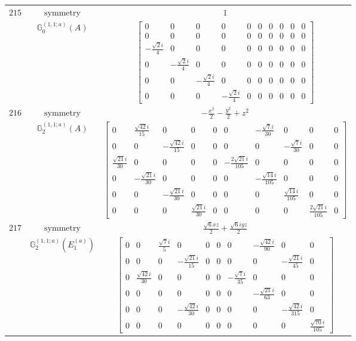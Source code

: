\documentclass[fleqn,8pt,landscape]{jsarticle}
\begin{document}
\begin{longtable}{ccc}
$ 215 $ & $ \text{symmetry} $ & $ 1 $ \\
$  $ & $ \mathbb{G}_{0}^{(1,1;a)}(A) $ & $ \begin{bmatrix} 0 & 0 & 0 & 0 & 0 & 0 & 0 & 0 & 0 & 0 \\ 0 & 0 & 0 & 0 & 0 & 0 & 0 & 0 & 0 & 0 \\ - \frac{\sqrt{2} i}{4} & 0 & 0 & 0 & 0 & 0 & 0 & 0 & 0 & 0 \\ 0 & - \frac{\sqrt{2} i}{4} & 0 & 0 & 0 & 0 & 0 & 0 & 0 & 0 \\ 0 & 0 & - \frac{\sqrt{2} i}{4} & 0 & 0 & 0 & 0 & 0 & 0 & 0 \\ 0 & 0 & 0 & - \frac{\sqrt{2} i}{4} & 0 & 0 & 0 & 0 & 0 & 0 \end{bmatrix} $ \\ \hline
$ 216 $ & $ \text{symmetry} $ & $ - \frac{x^{2}}{2} - \frac{y^{2}}{2} + z^{2} $ \\
$  $ & $ \mathbb{G}_{2}^{(1,1;a)}(A) $ & $ \begin{bmatrix} 0 & \frac{\sqrt{42} i}{15} & 0 & 0 & 0 & 0 & - \frac{\sqrt{7} i}{30} & 0 & 0 & 0 \\ 0 & 0 & - \frac{\sqrt{42} i}{15} & 0 & 0 & 0 & 0 & - \frac{\sqrt{7} i}{30} & 0 & 0 \\ \frac{\sqrt{21} i}{30} & 0 & 0 & 0 & 0 & - \frac{2 \sqrt{21} i}{105} & 0 & 0 & 0 & 0 \\ 0 & - \frac{\sqrt{21} i}{30} & 0 & 0 & 0 & 0 & - \frac{\sqrt{14} i}{105} & 0 & 0 & 0 \\ 0 & 0 & - \frac{\sqrt{21} i}{30} & 0 & 0 & 0 & 0 & \frac{\sqrt{14} i}{105} & 0 & 0 \\ 0 & 0 & 0 & \frac{\sqrt{21} i}{30} & 0 & 0 & 0 & 0 & \frac{2 \sqrt{21} i}{105} & 0 \end{bmatrix} $ \\ \hline
$ 217 $ & $ \text{symmetry} $ & $ \frac{\sqrt{6} x z}{2} + \frac{\sqrt{6} i y z}{2} $ \\
$  $ & $ \mathbb{G}_{2}^{(1,1;a)}(E_{1}^{(a)}) $ & $ \begin{bmatrix} 0 & 0 & \frac{\sqrt{7} i}{5} & 0 & 0 & 0 & 0 & - \frac{\sqrt{42} i}{90} & 0 & 0 \\ 0 & 0 & 0 & - \frac{\sqrt{21} i}{15} & 0 & 0 & 0 & 0 & - \frac{\sqrt{21} i}{45} & 0 \\ 0 & \frac{\sqrt{42} i}{30} & 0 & 0 & 0 & 0 & - \frac{\sqrt{7} i}{35} & 0 & 0 & 0 \\ 0 & 0 & 0 & 0 & 0 & 0 & 0 & - \frac{\sqrt{21} i}{63} & 0 & 0 \\ 0 & 0 & 0 & - \frac{\sqrt{42} i}{30} & 0 & 0 & 0 & 0 & - \frac{\sqrt{42} i}{315} & 0 \\ 0 & 0 & 0 & 0 & 0 & 0 & 0 & 0 & 0 & \frac{\sqrt{70} i}{105} \end{bmatrix} $ \\ \hline

\end{longtable}
\end{document}
